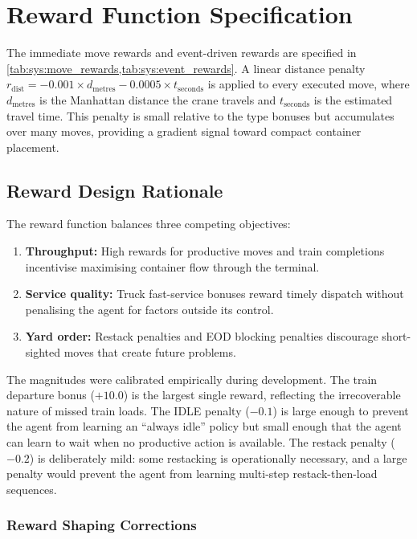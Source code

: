 \chapter{Reward Function Specification}
\label{app:reward}

The immediate move rewards and event-driven rewards are specified in \cref{tab:sys:move_rewards,tab:sys:event_rewards}. A linear distance penalty $r_{\text{dist}} = -0.001 \times d_{\text{metres}} - 0.0005 \times t_{\text{seconds}}$ is applied to every executed move, where $d_{\text{metres}}$ is the Manhattan distance the crane travels and $t_{\text{seconds}}$ is the estimated travel time. This penalty is small relative to the type bonuses but accumulates over many moves, providing a gradient signal toward compact container placement.

\section{Reward Design Rationale}
\label{app:reward:rationale}

The reward function balances three competing objectives:

\begin{enumerate}
  \item \textbf{Throughput:} High rewards for productive moves and train completions incentivise maximising container flow through the terminal.
  \item \textbf{Service quality:} Truck fast-service bonuses reward timely dispatch without penalising the agent for factors outside its control.
  \item \textbf{Yard order:} Restack penalties and EOD blocking penalties discourage short-sighted moves that create future problems.
\end{enumerate}

The magnitudes were calibrated empirically during development. The train departure bonus ($+10.0$) is the largest single reward, reflecting the irrecoverable nature of missed train loads. The IDLE penalty ($-0.1$) is large enough to prevent the agent from learning an ``always idle'' policy but small enough that the agent can learn to wait when no productive action is available. The restack penalty ($-0.2$) is deliberately mild: some restacking is operationally necessary, and a large penalty would prevent the agent from learning multi-step restack-then-load sequences.

\subsection{Reward Shaping Corrections}
\label{app:reward:corrections}

